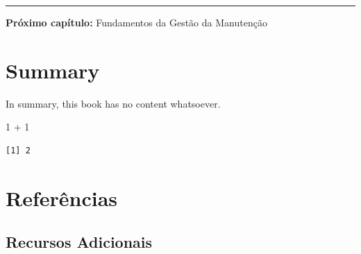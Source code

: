 \documentclass[
  letterpaper,
]{book}
\newenvironment{Shaded}{\begin{snugshade}}{\end{snugshade}}
\newcommand{\DecValTok}[1]{\textcolor[rgb]{0.68,0.00,0.00}{#1}}
\newcommand{\SpecialCharTok}[1]{\textcolor[rgb]{0.37,0.37,0.37}{#1}}
\newlength{\cslhangindent}
\newenvironment{CSLReferences}[2] %
 {\begin{list}{}{%
  \setlength{\itemindent}{0pt}
  \setlength{\leftmargin}{0pt}
  \setlength{\parsep}{0pt}
  \ifodd #1
   \setlength{\leftmargin}{\cslhangindent}
   \setlength{\itemindent}{-1\cslhangindent}
  \fi
  \setlength{\itemsep}{#2\baselineskip}}}
 {\end{list}}
\begin{document}
\begin{center}\rule{0.5\linewidth}{0.5pt}\end{center}

\textbf{Próximo capítulo:} Fundamentos da Gestão da Manutenção

\chapter{}\label{section}

\chapter{}\label{section-1}

\chapter{}\label{section-2}


\chapter{Summary}\label{summary}

In summary, this book has no content whatsoever.

\begin{Shaded}
\begin{Highlighting}[]
\DecValTok{1} \SpecialCharTok{+} \DecValTok{1}
\end{Highlighting}
\end{Shaded}

\begin{verbatim}
[1] 2
\end{verbatim}


\chapter*{Referências}\label{referuxeancias}


\label{refs}
\begin{CSLReferences}{0}{1}
\end{CSLReferences}

\section*{Recursos Adicionais}\label{recursos-adicionais}
\end{document}
